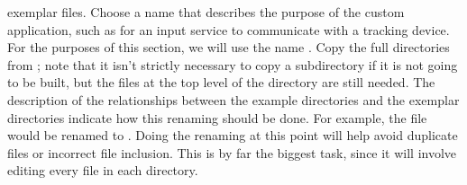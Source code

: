 exemplar files.
Choose a name that describes the purpose of the custom application, such as
 for an input service to communicate with a tracking device.
For the purposes of this section, we will use the name .
\tertiaryEnd{}
Copy the full directories from ; note that it isn't strictly necessary
to copy a subdirectory if it is not going to be built, but the files at the top level of
the directory are still needed.
\tertiaryEnd{}
The description of the relationships between the example directories and the exemplar
directories indicate how this renaming should be done.
For example, the file  would be renamed to
.
Doing the renaming at this point will help avoid duplicate files or incorrect file
inclusion.
\tertiaryEnd{}
This is by far the biggest task, since it will involve editing every file in each
directory.
